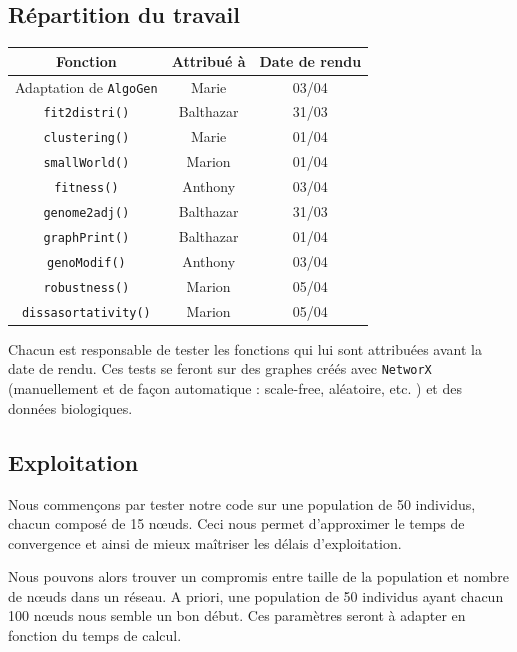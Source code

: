\subsection{Répartition du travail}

\begin{center}
\begin{table}[!h]
\begin{tabular}{|c|c|c|}
\hline Fonction & Attribué à & Date de rendu \\
\hline
Adaptation de \verb?AlgoGen? & Marie & 03/04 \\
\hline
\verb?fit2distri()? & Balthazar & 31/03 \\
\hline
\verb?clustering()? & Marie & 01/04\\
\hline 
\verb?smallWorld()? & Marion & 01/04\\
\hline
\verb?fitness()? & Anthony & 03/04\\
\hline 
\verb?genome2adj()? & Balthazar & 31/03 \\
\hline 
\verb?graphPrint()? & Balthazar & 01/04 \\
\hline 
\verb?genoModif()? & Anthony & 03/04 \\
\hline 
\verb?robustness()? & Marion & 05/04 \\
\hline 
\verb?dissasortativity()? & Marion & 05/04\\
\hline 
\end{tabular}
\end{table}
\end{center}

Chacun est responsable de tester les fonctions qui lui sont attribuées avant la date de rendu. Ces tests se feront sur des graphes créés avec \verb?NetworX? (manuellement et de façon automatique : scale-free, aléatoire, etc. ) et des données biologiques.

\subsection{Exploitation}
Nous commençons par tester notre code sur une population de 50 individus, chacun composé de 15 nœuds. Ceci nous permet d'approximer le temps de convergence et ainsi de mieux ma\^itriser les délais d'exploitation.

Nous pouvons alors trouver un compromis entre taille de la population et nombre de nœuds dans un réseau. A priori, une population de 50 individus ayant chacun 100 nœuds nous semble un bon début. Ces paramètres seront à adapter en fonction du temps de calcul.

